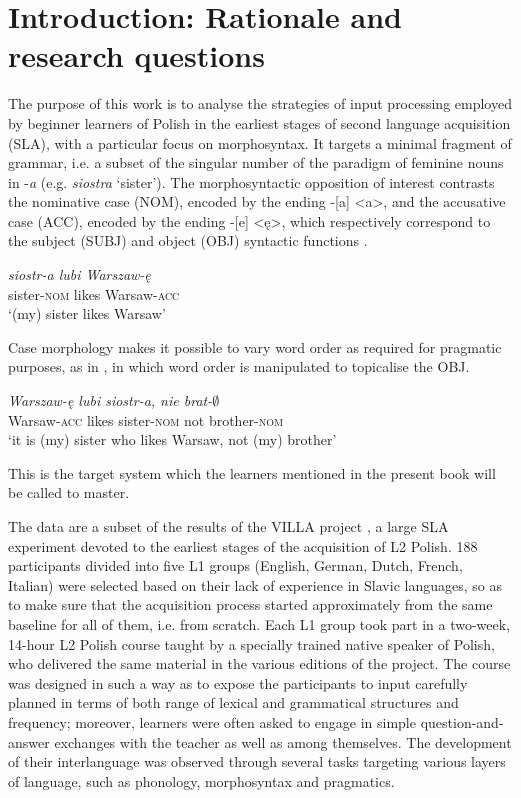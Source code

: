 \chapter{Introduction: Rationale and research questions}\label{sec:1}

The purpose of this work is to analyse the strategies of input processing employed by beginner learners of Polish in the earliest stages of second language acquisition (SLA), with a particular focus on morphosyntax. It targets a minimal fragment of grammar, i.e. a subset of the singular number of the paradigm of feminine nouns in -\textit{a} (e.g. \textit{siostra} ‘sister’). The morphosyntactic opposition of interest contrasts the nominative case (NOM), encoded by the ending -[a] <a>, and the accusative case (ACC), encoded by the ending -[e] <ę>, which respectively correspond to the subject (SUBJ) and object (OBJ) syntactic functions .

\ea%
    \label{ex:01:1}
    \gll    \textit{siostr-a 	lubi 	Warszaw-ę}\\
            sister-\textsc{nom} likes   Warsaw-\textsc{acc}\\
    \glt    ‘(my) sister likes Warsaw’
    \z

Case morphology makes it possible to vary word order as required for pragmatic purposes, as in , in which word order is manipulated to topicalise the OBJ. 

\ea%
    \label{ex:01:2}
    \gll    \textit{Warszaw-ę           lubi   siostr-a,            nie  brat-${\emptyset}$}\\
            Warsaw-\textsc{acc} likes  sister-\textsc{nom}  not  brother-\textsc{nom}\\
    \glt    ‘it is (my) sister who likes Warsaw, not (my) brother’
    \z

This is the target system which the learners mentioned in the present book will be called to master. 

The data are a subset of the results of the VILLA project \citep{DimrothEtAl2013}, a large SLA experiment devoted to the earliest stages of the acquisition of L2 Polish. 188 participants divided into five L1 groups (English, German, Dutch, French, Italian) were selected based on their lack of experience in Slavic languages, so as to make sure that the acquisition process started approximately from the same baseline for all of them, i.e. from scratch. Each L1 group took part in a two-week, 14-hour L2 Polish course taught by a specially trained native speaker of Polish, who delivered the same material in the various editions of the project. The course was designed in such a way as to expose the participants to input carefully planned in terms of both range of lexical and grammatical structures and frequency; moreover, learners were often asked to engage in simple question-and-answer exchanges with the teacher as well as among themselves. The development of their interlanguage was observed through several tasks targeting various layers of language, such as phonology, morphosyntax and pragmatics.

